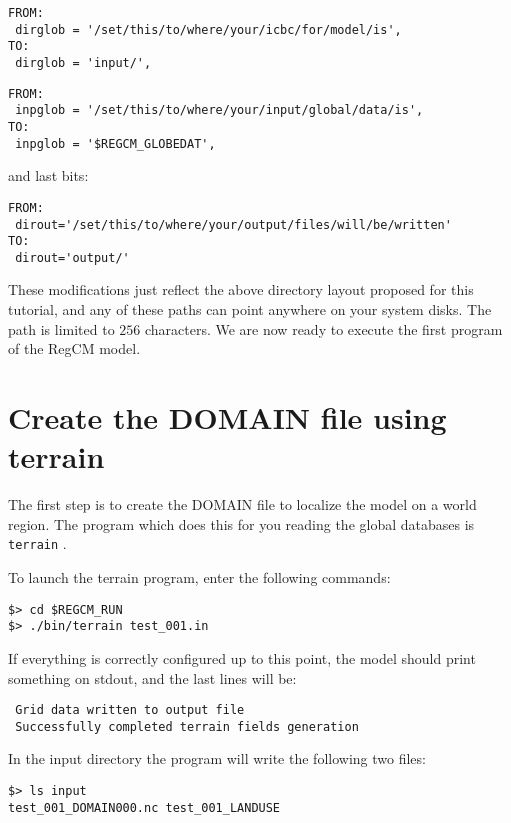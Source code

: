 \begin{Verbatim}
FROM:
 dirglob = '/set/this/to/where/your/icbc/for/model/is',
TO:
 dirglob = 'input/',
\end{Verbatim}

\begin{Verbatim}
FROM:
 inpglob = '/set/this/to/where/your/input/global/data/is',
TO:
 inpglob = '$REGCM_GLOBEDAT',
\end{Verbatim}

and last bits:

\begin{Verbatim}
FROM:
 dirout='/set/this/to/where/your/output/files/will/be/written'
TO:
 dirout='output/'
\end{Verbatim}

These modifications just reflect the above directory layout proposed for this
tutorial, and any of these paths can point anywhere on your system disks. The path
is limited to $256$ characters.
We are now ready to execute the first program of the RegCM model.

\section{Create the DOMAIN file using terrain}

The first step is to create the DOMAIN file to localize the model on a world region.
The program which does this for you reading the global databases is
\verb=terrain= .

To launch the terrain program, enter the following commands:

\begin{Verbatim}
$> cd $REGCM_RUN
$> ./bin/terrain test_001.in
\end{Verbatim}

If everything is correctly configured up to this point, the model should print
something on stdout, and the last lines will be:

\begin{Verbatim}
 Grid data written to output file                                               
 Successfully completed terrain fields generation
\end{Verbatim}

In the input directory the program will write the following two files:

\begin{Verbatim}
$> ls input
test_001_DOMAIN000.nc test_001_LANDUSE
\end{Verbatim}

